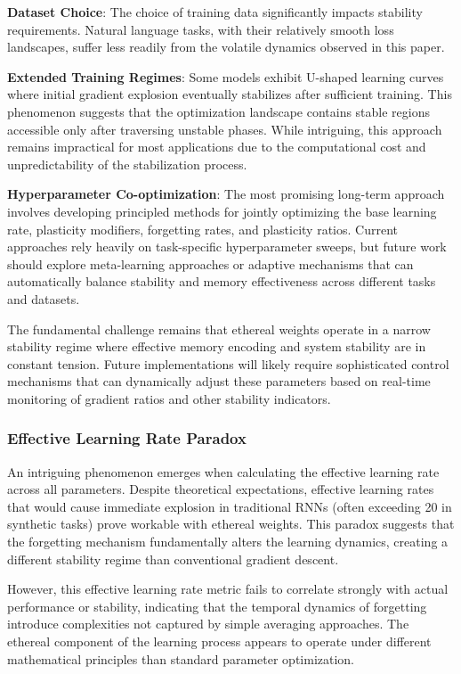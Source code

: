 \documentclass{article} %
\begin{document}
\textbf{Dataset Choice}: The choice of training data significantly impacts stability requirements. Natural language tasks, with their relatively smooth loss landscapes, suffer less readily from the volatile dynamics observed in this paper. 

\textbf{Extended Training Regimes}: Some models exhibit U-shaped learning curves where initial gradient explosion eventually stabilizes after sufficient training. This phenomenon suggests that the optimization landscape contains stable regions accessible only after traversing unstable phases. While intriguing, this approach remains impractical for most applications due to the computational cost and unpredictability of the stabilization process.

\textbf{Hyperparameter Co-optimization}: The most promising long-term approach involves developing principled methods for jointly optimizing the base learning rate, plasticity modifiers, forgetting rates, and plasticity ratios. Current approaches rely heavily on task-specific hyperparameter sweeps, but future work should explore meta-learning approaches or adaptive mechanisms that can automatically balance stability and memory effectiveness across different tasks and datasets.

The fundamental challenge remains that ethereal weights operate in a narrow stability regime where effective memory encoding and system stability are in constant tension. Future implementations will likely require sophisticated control mechanisms that can dynamically adjust these parameters based on real-time monitoring of gradient ratios and other stability indicators.

\subsubsection{Effective Learning Rate Paradox}

An intriguing phenomenon emerges when calculating the effective learning rate across all parameters. Despite theoretical expectations, effective learning rates that would cause immediate explosion in traditional RNNs (often exceeding 20 in synthetic tasks) prove workable with ethereal weights. This paradox suggests that the forgetting mechanism fundamentally alters the learning dynamics, creating a different stability regime than conventional gradient descent.

However, this effective learning rate metric fails to correlate strongly with actual performance or stability, indicating that the temporal dynamics of forgetting introduce complexities not captured by simple averaging approaches. The ethereal component of the learning process appears to operate under different mathematical principles than standard parameter optimization.
\end{document}
